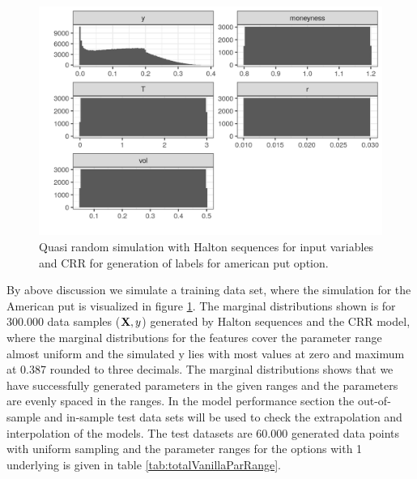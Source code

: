 \begin{figure}[th]
\centering
\includegraphics{Figures/marginalAmerPut.png}
\decoRule
\caption[Marginal Distributions For American Put]{Quasi random simulation with Halton sequences for input variables and CRR for generation of labels for american put option.}
\label{fig:marginalAmerPut}
\end{figure}

By above discussion we simulate a training data set, where the simulation for the American put is visualized in figure \ref{fig:marginalAmerPut}. The marginal distributions shown is for $300.000$ data samples ($\mathbf{X},y$) generated by Halton sequences and the CRR model, where the marginal distributions for the features cover the parameter range almost uniform and the simulated y lies with most values at zero and maximum at 0.387 rounded to three decimals. The marginal distributions shows that we have successfully generated parameters in the given ranges and the parameters are evenly spaced in the ranges. In the model performance section the out-of-sample and in-sample test data sets will be used to check the extrapolation and interpolation of the models. The test datasets are 60.000 generated data points with uniform sampling and the parameter ranges for the options with 1 underlying is given in table \ref{tab:totalVanillaParRange}.


